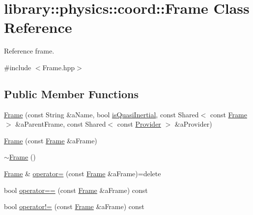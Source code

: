 \hypertarget{classlibrary_1_1physics_1_1coord_1_1_frame}{}\section{library\+:\+:physics\+:\+:coord\+:\+:Frame Class Reference}
\label{classlibrary_1_1physics_1_1coord_1_1_frame}


Reference frame.  




{\ttfamily \#include $<$Frame.\+hpp$>$}

\subsection*{Public Member Functions}
\begin{DoxyCompactItemize}
\item 
\hyperlink{classlibrary_1_1physics_1_1coord_1_1_frame_a6a8410c8b29584fe2c2c78370c72f695}{Frame} (const String \&a\+Name, bool \hyperlink{classlibrary_1_1physics_1_1coord_1_1_frame_a894d1ac6152e28dbb749058ca6ffd663}{is\+Quasi\+Inertial}, const Shared$<$ const \hyperlink{classlibrary_1_1physics_1_1coord_1_1_frame}{Frame} $>$ \&a\+Parent\+Frame, const Shared$<$ const \hyperlink{classlibrary_1_1physics_1_1coord_1_1frame_1_1_provider}{Provider} $>$ \&a\+Provider)
\item 
\hyperlink{classlibrary_1_1physics_1_1coord_1_1_frame_ac375d8c787f92815af3b41e605264966}{Frame} (const \hyperlink{classlibrary_1_1physics_1_1coord_1_1_frame}{Frame} \&a\+Frame)
\item 
\hyperlink{classlibrary_1_1physics_1_1coord_1_1_frame_a7a4b031eff12e290c0ccacb7d5a47dfd}{$\sim$\+Frame} ()
\item 
\hyperlink{classlibrary_1_1physics_1_1coord_1_1_frame}{Frame} \& \hyperlink{classlibrary_1_1physics_1_1coord_1_1_frame_acd5cf67c12acb2ef5e95355fea262ca7}{operator=} (const \hyperlink{classlibrary_1_1physics_1_1coord_1_1_frame}{Frame} \&a\+Frame)=delete
\item 
bool \hyperlink{classlibrary_1_1physics_1_1coord_1_1_frame_a19c5c4ce3b1669a774980d9c3f18fe6c}{operator==} (const \hyperlink{classlibrary_1_1physics_1_1coord_1_1_frame}{Frame} \&a\+Frame) const
\item 
bool \hyperlink{classlibrary_1_1physics_1_1coord_1_1_frame_a2b3b046c3779b4281f14601302446169}{operator!=} (const \hyperlink{classlibrary_1_1physics_1_1coord_1_1_frame}{Frame} \&a\+Frame) const
\item 

\end{DoxyCompactItemize}
